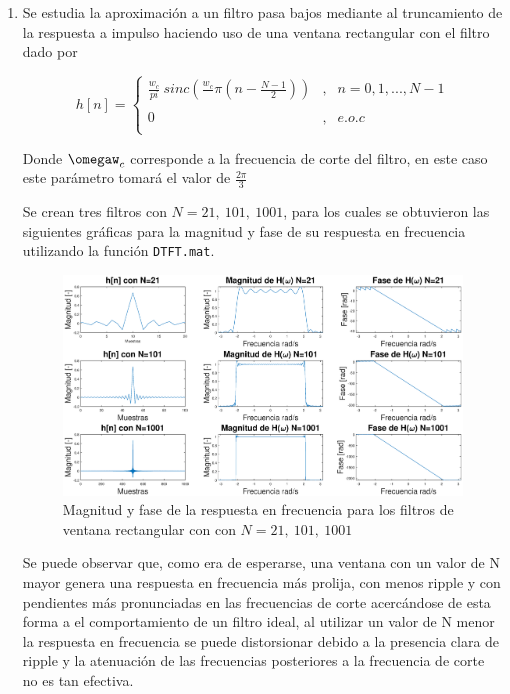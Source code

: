 \begin{enumerate}
    \item Se estudia la aproximación a un filtro pasa bajos mediante al truncamiento de la respuesta a impulso haciendo uso  de una ventana rectangular  con el filtro dado por 
    
 $$   
h[n]= \left\{ \begin{array}{lcc}
             \frac{w_c}{pi}~sinc(\frac{w_c}~{\pi} (n- \frac{N-1}{2})) &   ,  & n = 0,1,..., N-1 \\
             \\ 0 &  ,  & e.o.c \\
  
             \end{array}
   \right.  
   $$


Donde $\omegaw_c$ corresponde a la frecuencia de corte del filtro, en este caso este parámetro tomará el valor de $\frac{2\pi}{3}$

Se crean tres filtros con $N = 21,~ 101,~ 1001$, para los cuales se obtuvieron las siguientes gráficas para la magnitud  y fase de su respuesta en frecuencia utilizando la función \texttt{DTFT.mat}.

\begin{figure}[H]
    \centering
    \includegraphics[scale = 0.3]{Figuras/p2_1-Sincs.eps}
    \caption{Magnitud y fase de la respuesta en frecuencia para los filtros de ventana rectangular con  con $N = 21,~ 101,~ 1001$}
    \label{}
\end{figure}

Se puede observar que, como era de esperarse, una ventana con un valor de N mayor genera una respuesta en frecuencia más prolija, con menos ripple y con pendientes más pronunciadas en las frecuencias de corte acercándose de esta forma a el comportamiento de un filtro ideal, al utilizar un valor de N menor la respuesta en frecuencia se puede distorsionar debido a la presencia clara de ripple y la atenuación de las frecuencias posteriores a la frecuencia de corte no es tan efectiva.


\end{enumerate}
